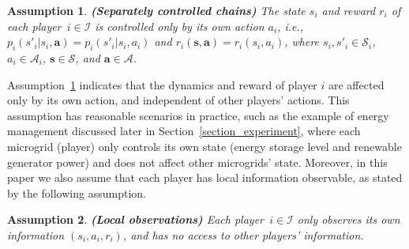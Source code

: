 \documentclass[12pt]{article}
\newtheorem{assumption}{Assumption}
\begin{document}
\begin{assumption}\textbf{(Separately controlled chains)}
\label{assm_1} The state $s_i$ and reward $r_i$ of each player~$i
\in \mathcal I$ is controlled only by its own action $a_i$, i.e.,
$p_i(s'_i|s_i, \bm a) = p_i(s'_i|s_i,a_i)$ and $r_i(\bm s, \bm
a)=r_i(s_i,a_i)$, where $s_i, s'_i \in \mathcal S_i$, $a_i \in
\mathcal A_i$, $\bm s \in \mathcal S$, and $\bm a \in \mathcal A$.
\end{assumption}

Assumption~\ref{assm_1} indicates that the dynamics and reward of
player $i$ are affected only by its own action, and independent of
other players' actions. This assumption has reasonable scenarios in
practice, such as the example of energy management discussed later
in Section~\ref{section_experiment}, where each microgrid (player)
only controls its own state (energy storage level and renewable
generator power) and does not affect other microgrids' state.
Moreover, in this paper we also assume that each player has local
information observable, as stated by the following assumption.

\begin{assumption}\textbf{(Local observations)}
\label{assm_2} Each player~$i \in \mathcal I$ only observes its own
information $(s_i, a_i, r_i)$, and has no access to other players'
information.
\end{assumption}
\end{document}
